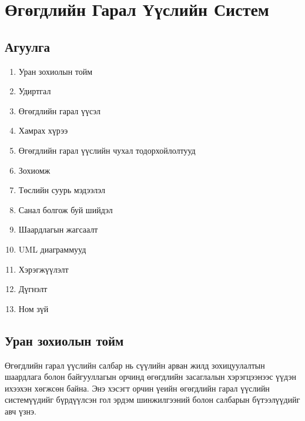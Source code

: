 
\section{Өгөгдлийн Гарал Үүслийн Систем}
\label{sec:data_lineage_system}

\subsection*{Агуулга}
\begin{enumerate}
    \item Уран зохиолын тойм
    \item Удиртгал
    \item Өгөгдлийн гарал үүсэл
    \item Хамрах хүрээ
    \item Өгөгдлийн гарал үүслийн чухал тодорхойлолтууд
    \item Зохиомж
    \item Төслийн суурь мэдээлэл
    \item Санал болгож буй шийдэл
    \item Шаардлагын жагсаалт
    \item UML диаграммууд
    \item Хэрэгжүүлэлт
    \item Дүгнэлт
    \item Ном зүй
\end{enumerate}

\hrulefill

\subsection{Уран зохиолын тойм}
\label{subsec:literature_survey}

Өгөгдлийн гарал үүслийн салбар нь сүүлийн арван жилд зохицуулалтын шаардлага болон байгууллагын орчинд өгөгдлийн засаглалын хэрэгцээнээс үүдэн ихээхэн хөгжсөн байна. Энэ хэсэгт орчин үеийн өгөгдлийн гарал үүслийн системүүдийг бүрдүүлсэн гол эрдэм шинжилгээний болон салбарын бүтээлүүдийг авч үзнэ.


